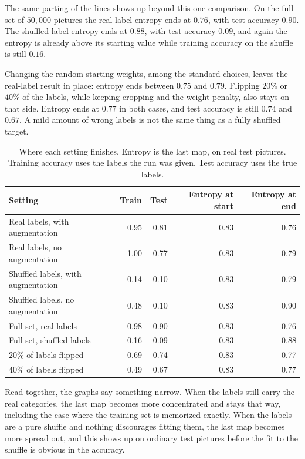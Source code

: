\documentclass[11pt,a4paper]{article}
\begin{document}
The same parting of the lines shows up beyond this one comparison. On the full set of \(50{,}000\) pictures the real-label entropy ends at \(0.76\), with test accuracy \(0.90\). The shuffled-label entropy ends at \(0.88\), with test accuracy \(0.09\), and again the entropy is already above its starting value while training accuracy on the shuffle is still \(0.16\).

Changing the random starting weights, among the standard choices, leaves the real-label result in place: entropy ends between \(0.75\) and \(0.79\). Flipping \(20\%\) or \(40\%\) of the labels, while keeping cropping and the weight penalty, also stays on that side. Entropy ends at \(0.77\) in both cases, and test accuracy is still \(0.74\) and \(0.67\). A mild amount of wrong labels is not the same thing as a fully shuffled target.

\begin{table}[ht]
\centering
\caption{Where each setting finishes.
Entropy is the last map, on real test pictures.
Training accuracy uses the labels the run was given.
Test accuracy uses the true labels.}
\label{tab:endpoints}
\small
\begin{tabular}{@{}lrrrr@{}}
\toprule
Setting & Train & Test & Entropy at start & Entropy at end \\
\midrule
Real labels, with augmentation & 0.95 & 0.81 & 0.83 & 0.76 \\
Real labels, no augmentation & 1.00 & 0.77 & 0.83 & 0.79 \\
Shuffled labels, with augmentation & 0.14 & 0.10 & 0.83 & 0.79 \\
Shuffled labels, no augmentation & 0.48 & 0.10 & 0.83 & 0.90 \\
\midrule
Full set, real labels & 0.98 & 0.90 & 0.83 & 0.76 \\
Full set, shuffled labels & 0.16 & 0.09 & 0.83 & 0.88 \\
\midrule
20\% of labels flipped & 0.69 & 0.74 & 0.83 & 0.77 \\
40\% of labels flipped & 0.49 & 0.67 & 0.83 & 0.77 \\
\bottomrule
\end{tabular}
\end{table}

Read together, the graphs say something narrow. When the labels still carry the real categories, the last map becomes more concentrated and stays that way, including the case where the training set is memorized exactly. When the labels are a pure shuffle and nothing discourages fitting them, the last map becomes more spread out, and this shows up on ordinary test pictures before the fit to the shuffle is obvious in the accuracy.
\end{document}
